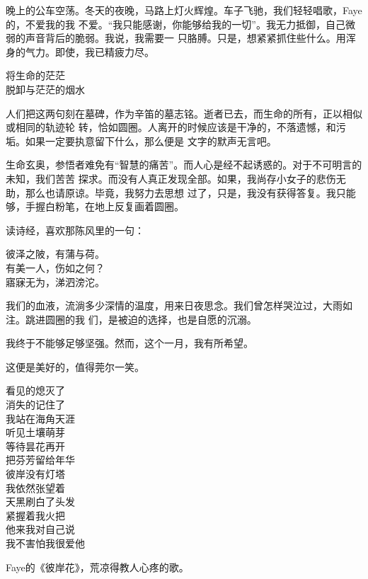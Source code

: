 \documentclass[12pt,a4paper]{article}
\begin{document}
		晚上的公车空荡。冬天的夜晚，马路上灯火辉煌。车子飞驰，我们轻轻唱歌，Faye的，不爱我的我
	不爱。“我只能感谢，你能够给我的一切”。我无力抵御，自己微弱的声音背后的脆弱。我说，我需要一
	只胳膊。只是，想紧紧抓住些什么。用浑身的气力。即使，我已精疲力尽。

		\longpoem{}{}{}
		将生命的茫茫 \\
		脱卸与茫茫的烟水
		\endlongpoem

		人们把这两句刻在墓碑，作为辛笛的墓志铭。逝者已去，而生命的所有，正以相似或相同的轨迹轮
	转，恰如圆圈。人离开的时候应该是干净的，不落遗憾，和污垢。如果一定要执意留下什么，那么便是
	文字的默声无言吧。


		生命玄奥，参悟者难免有“智慧的痛苦”。而人心是经不起诱惑的。对于不可明言的未知，我们苦苦
	探求。而没有人真正发现全部。如果，我尚存小女子的悲伤无助，那么也请原谅。毕竟，我努力去思想
	过了，只是，我没有获得答复。我只能够，手握白粉笔，在地上反复画着圆圈。


		读诗经，喜欢那陈风里的一句：

		\shortpoem{}{}{}
			彼泽之陂，有蒲与荷。\\
			有美一人，伤如之何？\\
			寤寐无为，涕泗滂沱。\\
		\endshortpoem

		我们的血液，流淌多少深情的温度，用来日夜思念。我们曾怎样哭泣过，大雨如注。跳进圆圈的我
	们，是被迫的选择，也是自愿的沉溺。


		我终于不能够足够坚强。然而，这个一月，我有所希望。

		这便是美好的，值得莞尔一笑。

	\endwriting



		\longpoem{}{}{}
		看见的熄灭了 \\
		消失的记住了 \\
		我站在海角天涯 \\
		听见土壤萌芽 \\
		等待昙花再开 \\
		把芬芳留给年华 \\
		彼岸没有灯塔 \\
		我依然张望着 \\
		天黑刷白了头发 \\
		紧握着我火把 \\
		他来我对自己说 \\
		我不害怕我很爱他
		\endlongpoem

		Faye的《彼岸花》，荒凉得教人心疼的歌。
\end{document}
